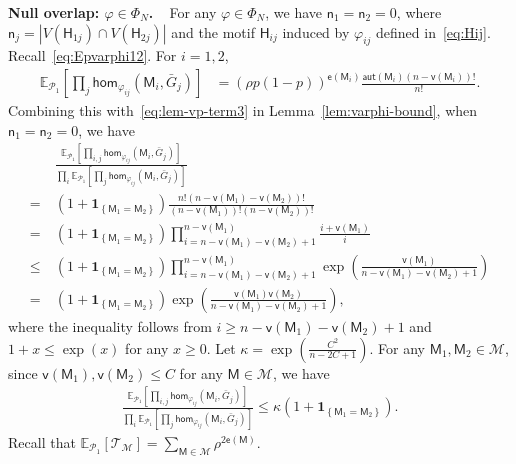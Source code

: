 \documentclass[letterpaper,11pt]{article}
\theoremstyle{definition}
\newcommand{\maM}{\mathcal{M}}
\newcommand{\maP}{\mathcal{P}}
\newcommand{\maT}{\mathcal{T}}
\newcommand{\en}{\mathsf{{e}}}
\newcommand{\vn}{\mathsf{{v}}}
\newcommand{\pth}[1]{\left( #1 \right)}
\newcommand{\qth}[1]{\left[ #1 \right]}
\newcommand{\sfH}{{\mathsf{H}}}
\newcommand{\sfM}{{\mathsf{M}}}
\newcommand{\sfn}{{\mathsf{n}}}
\newcommand{\indc}[1]{{\mathbf{1}_{\left\{{#1}\right\}}}}
\newcommand{\aut}{\mathsf{aut}}
\renewcommand{\hom}{\mathsf{hom}}
\newcommand{\vp}{\varphi}
\def\E{\mathbb{E}}
\begin{document}
\textbf{Null overlap: $\vp\in \Phi_N$.\ \ }For any $\vp \in \Phi_N$, we have $\sfn_1 = \sfn_2 = 0$, where $\sfn_j = |V(\sfH_{1j})\cap V(\sfH_{2j})|$ and the motif $\sfH_{ij}$ induced by $\vp_{ij}$ defined in~\eqref{eq:Hij}.
Recall~\eqref{eq:Epvarphi12}. For $i=1,2$, 
\begin{align*}
    \E_{\maP_1}\qth{\prod_{j}\hom_{\vp_{ij}}(\sfM_i,\bar{G}_j)} &= \pth{\rho p (1-p)}^{\en(\sfM_i)} \frac{\aut(\sfM_i) (n-\vn(\sfM_i))!}{n!}.
\end{align*}
Combining this with~\eqref{eq:lem-vp-term3} in Lemma~\ref{lem:varphi-bound}, when $\sfn_1 = \sfn_2 = 0$, we have \begin{align}
    \nonumber &~\frac{\E_{\maP_1}\qth{\prod_{i,j}\hom_{\vp_{ij}}(\sfM_i,\bar{G}_j)}}{\prod_{i}\E_{\maP_1}\qth{\prod_{j}\hom_{\vp_{ij}}(\sfM_i,\bar{G}_j)} }\\\nonumber=&~ (1+\indc{\sfM_1 = \sfM_2}) \frac{n!(n-\vn(\sfM_1)-\vn(\sfM_2))! }{(n-\vn(\sfM_1))!(n-\vn(\sfM_2))!}\\\nonumber =&~(1+\indc{\sfM_1 = \sfM_2}) \prod_{i=n-\vn(\sfM_1)-\vn(\sfM_2)+1}^{n-\vn(\sfM_1)} \frac{i+\vn(\sfM_1)}{i}\\\nonumber 
    \le&~(1+\indc{\sfM_1 = \sfM_2})\prod_{i=n-\vn(\sfM_1)-\vn(\sfM_2)+1}^{n-\vn(\sfM_1)} \exp\pth{ \frac{\vn(\sfM_1)}{n-\vn(\sfM_1)-\vn(\sfM_2)+1}}\\\nonumber =&~(1+\indc{\sfM_1 = \sfM_2})\exp\pth{\frac{\vn(\sfM_1)\vn(\sfM_2)}{n-\vn(\sfM_1)-\vn(\sfM_2)+1}},
\end{align} 
where the inequality follows from $i\ge n-\vn(\sfM_1)-\vn(\sfM_2)+1$ and $1+x\le \exp(x)$ for any $x\ge 0$. Let $\kappa =\exp\pth{\frac{C^2}{n-2C+1}}$. 
For any $\sfM_1,\sfM_2\in \maM$, since $\vn(\sfM_1), \vn(\sfM_2)\le C$ for any $\sfM\in \maM$, we have 
\begin{align}\label{eq:prop2-pf-term2-1}
    \frac{\E_{\maP_1}\qth{\prod_{i,j}\hom_{\vp_{ij}}(\sfM_i,\bar{G}_j)}}{\prod_{i}\E_{\maP_1}\qth{\prod_{j}\hom_{\vp_{ij}}(\sfM_i,\bar{G}_j)} }\le \kappa (1+\indc{\sfM_1=\sfM_2}).
\end{align}
Recall that $ \E_{\maP_1}\qth{\maT_{\maM}} = \sum_{\sfM\in \maM}\rho^{2\en(\sfM)}$.
\end{document}
